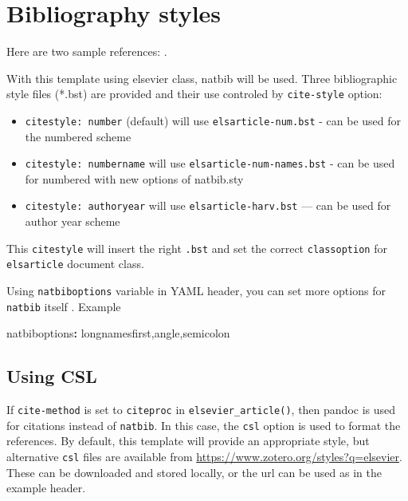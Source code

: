 \documentclass[
  authoryear,
  preprint]{elsarticle}
\newenvironment{Shaded}{\begin{snugshade}}{\end{snugshade}}
\newcommand{\AttributeTok}[1]{\textcolor[rgb]{0.40,0.45,0.13}{#1}}
\newcommand{\FunctionTok}[1]{\textcolor[rgb]{0.28,0.35,0.67}{#1}}
\newcommand{\KeywordTok}[1]{\textcolor[rgb]{0.00,0.23,0.31}{\textbf{#1}}}
\providecommand{\tightlist}{%
  \setlength{\itemsep}{0pt}\setlength{\parskip}{0pt}}
\begin{document}
\section{Bibliography styles}\label{bibliography-styles}

Here are two sample references: \citet{Feynman1963118}
\citet{Dirac1953888}.

With this template using elsevier class, natbib will be used. Three
bibliographic style ﬁles (*.bst) are provided and their use controled by
\texttt{cite-style} option:

\begin{itemize}
\tightlist
\item
  \texttt{citestyle:\ number} (default) will use
  \texttt{elsarticle-num.bst} - can be used for the numbered scheme
\item
  \texttt{citestyle:\ numbername} will use
  \texttt{elsarticle-num-names.bst} - can be used for numbered with new
  options of natbib.sty
\item
  \texttt{citestyle:\ authoryear} will use \texttt{elsarticle-harv.bst}
  --- can be used for author year scheme
\end{itemize}

This \texttt{citestyle} will insert the right \texttt{.bst} and set the
correct \texttt{classoption} for \texttt{elsarticle} document class.

Using \texttt{natbiboptions} variable in YAML header, you can set more
options for \texttt{natbib} itself . Example

\begin{Shaded}
\begin{Highlighting}[]
\FunctionTok{natbiboptions}\KeywordTok{:}\AttributeTok{ longnamesfirst,angle,semicolon}
\end{Highlighting}
\end{Shaded}

\subsection{Using CSL}\label{using-csl}

If \texttt{cite-method} is set to \texttt{citeproc} in
\texttt{elsevier\_article()}, then pandoc is used for citations instead
of \texttt{natbib}. In this case, the \texttt{csl} option is used to
format the references. By default, this template will provide an
appropriate style, but alternative \texttt{csl} files are available from
\url{https://www.zotero.org/styles?q=elsevier}. These can be downloaded
and stored locally, or the url can be used as in the example header.
\end{document}
